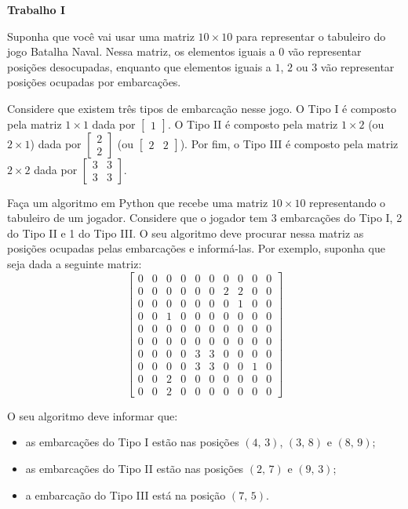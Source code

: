 \documentclass[12pt,a4paper]{article}
\begin{document}
\begin{center}
  \textbf{Trabalho I}
\end{center}

  Suponha que você vai usar uma matriz $10\times 10$ para representar o tabuleiro 
  do jogo Batalha Naval. Nessa matriz, os elementos iguais a $0$ vão representar 
  posições desocupadas, enquanto que elementos iguais a $1$, $2$ ou $3$ vão representar
  posições ocupadas por embarcações.
  
  Considere que existem três tipos de embarcação nesse
  jogo. O Tipo I é composto pela matriz $1\times 1$ dada por $\begin{bmatrix} 1 \end{bmatrix}$.
  O Tipo II é composto pela matriz $1\times 2$ (ou $2\times 1$) dada por 
  $\begin{bmatrix} 2 \\ 2 \end{bmatrix}$ (ou $\begin{bmatrix} 2 & 2 \end{bmatrix}$).
  Por fim, o Tipo III é composto pela matriz $2\times 2$ dada por 
  $\begin{bmatrix} 3 & 3\\ 3 & 3 \end{bmatrix}$.
  
  Faça um algoritmo em Python que recebe uma matriz $10\times 10$ representando 
  o tabuleiro de um jogador. Considere que o jogador tem 3 embarcações do Tipo I,
  2 do Tipo II e 1 do Tipo III. O seu algoritmo deve procurar nessa matriz as posições
  ocupadas pelas embarcações e informá-las. Por exemplo, suponha que seja dada a seguinte
  matriz:
  $$
  \begin{bmatrix}
    0 & 0 & 0 & 0 & 0 & 0 & 0 & 0 & 0 & 0 \\
    0 & 0 & 0 & 0 & 0 & 0 & 2 & 2 & 0 & 0 \\
    0 & 0 & 0 & 0 & 0 & 0 & 0 & 1 & 0 & 0 \\
    0 & 0 & 1 & 0 & 0 & 0 & 0 & 0 & 0 & 0 \\
    0 & 0 & 0 & 0 & 0 & 0 & 0 & 0 & 0 & 0 \\
    0 & 0 & 0 & 0 & 0 & 0 & 0 & 0 & 0 & 0 \\
    0 & 0 & 0 & 0 & 3 & 3 & 0 & 0 & 0 & 0 \\
    0 & 0 & 0 & 0 & 3 & 3 & 0 & 0 & 1 & 0 \\
    0 & 0 & 2 & 0 & 0 & 0 & 0 & 0 & 0 & 0 \\
    0 & 0 & 2 & 0 & 0 & 0 & 0 & 0 & 0 & 0
  \end{bmatrix}
  $$  
  
  O seu algoritmo deve informar que:
  
  \begin{itemize}
    \item as embarcações do Tipo I estão nas posições $(4,\, 3)$, $(3,\, 8)$ e
    $(8,\, 9)$;
    \item as embarcações do Tipo II estão nas posições $(2,\, 7)$ e $(9,\, 3)$;
    \item a embarcação do Tipo III está na posição $(7,\, 5)$.
  \end{itemize}
\end{document}

